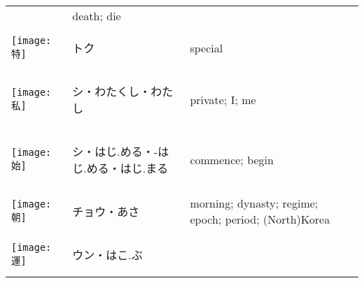 \documentclass[a4paper,12pt]{extarticle}
\begin{document}
\begin{longtable}{|lp{6cm}p{4cm}|}
&
death; die
\\ 
\begin{minipage}{0.3\textwidth}
\centerline{
	\texttt{[image: 特]}
}
\end{minipage}
&
\begin{CJK}{UTF8}{min}トク\end{CJK}
&
special
\\ 
\begin{minipage}{0.3\textwidth}
\centerline{
	\texttt{[image: 私]}
}
\end{minipage}
&
\begin{CJK}{UTF8}{min}シ・わたくし・わたし\end{CJK}
&
private; I; me
\\ 
\begin{minipage}{0.3\textwidth}
\centerline{
	\texttt{[image: 始]}
}
\end{minipage}
&
\begin{CJK}{UTF8}{min}シ・はじ.める・-はじ.める・はじ.まる\end{CJK}
&
commence; begin
\\ 
\begin{minipage}{0.3\textwidth}
\centerline{
	\texttt{[image: 朝]}
}
\end{minipage}
&
\begin{CJK}{UTF8}{min}チョウ・あさ\end{CJK}
&
morning; dynasty; regime; epoch; period; (North)Korea
\\ 
\begin{minipage}{0.3\textwidth}
\centerline{
	\texttt{[image: 運]}
}
\end{minipage}
&
\begin{CJK}{UTF8}{min}ウン・はこ.ぶ\end{CJK}

\end{longtable}
\end{document}
